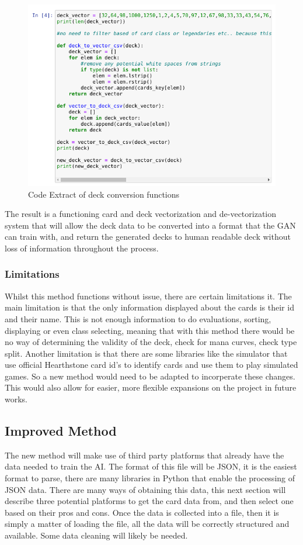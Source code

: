 \documentclass{report} %
\begin{document}
\begin{figure}[H]
\centering
\includegraphics[width=1\textwidth]{deckConversion}
\caption{Code Extract of deck conversion functions\protect}
 \label{board}
\end{figure}

The result is a functioning card and deck vectorization and de-vectorization system that will allow the deck data to be converted into a format that the GAN can train with, and return the generated decks to human readable deck without loss of information throughout the process.
\subsubsection{Limitations}

Whilst this method functions without issue, there are certain limitations it. The main limitation is that the only information displayed about the cards is their id and their name. This is not enough information to do evaluations, sorting, displaying or even class selecting, meaning that with this method there would be no way of determining the validity of the deck, check for mana curves, check type split. Another limitation is that there are some libraries like the simulator that use official Hearthstone card id's to identify cards and use them to play simulated games. So a new method would need to be adapted to incorperate these changes. This would also allow for easier, more flexible expansions on the project in future works.
\subsection{Improved Method}
The new method will make use of third party platforms that already have the data needed to train the AI. The format of this file will be JSON, it is the easiest format to parse, there are many libraries in Python that enable the processing of JSON data. There are many ways of obtaining this data, this next section will describe three potential platforms to get the card data from, and then select one based on their pros and cons. Once the data is collected into a file, then it is simply a matter of loading the file, all the data will be correctly structured and available. Some data cleaning will likely be needed. 
\end{document}
